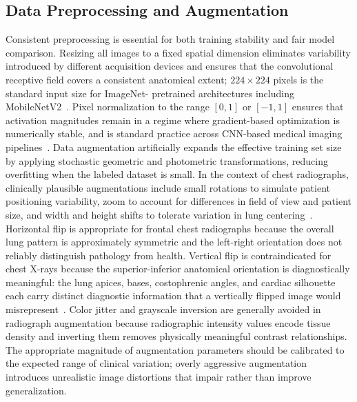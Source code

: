 \documentclass[preprint,12pt]{elsarticle}
\begin{document}
\subsection{Data Preprocessing and Augmentation}
Consistent preprocessing is essential for both training stability and
fair model comparison.
Resizing all images to a fixed spatial dimension eliminates variability
introduced by different acquisition devices and ensures that the
convolutional receptive field covers a consistent anatomical extent;
$224 \times 224$ pixels is the standard input size for ImageNet-
pretrained architectures including MobileNetV2~\cite{mobilenetv2}.
Pixel normalization to the range $[0, 1]$ or $[-1, 1]$ ensures that
activation magnitudes remain in a regime where gradient-based
optimization is numerically stable, and is standard practice across
CNN-based medical imaging pipelines~\cite{shorten2019}.
Data augmentation artificially expands the effective training set size
by applying stochastic geometric and photometric transformations,
reducing overfitting when the labeled dataset is small.
In the context of chest radiographs, clinically plausible
augmentations include small rotations to simulate patient positioning
variability, zoom to account for differences in field of view and
patient size, and width and height shifts to tolerate variation in
lung centering~\cite{shorten2019}.
Horizontal flip is appropriate for frontal chest radiographs because
the overall lung pattern is approximately symmetric and the left-right
orientation does not reliably distinguish pathology from health.
Vertical flip is contraindicated for chest X-rays because the
superior-inferior anatomical orientation is diagnostically meaningful:
the lung apices, bases, costophrenic angles, and cardiac silhouette
each carry distinct diagnostic information that a vertically flipped
image would misrepresent~\cite{chouhan2020}.
Color jitter and grayscale inversion are generally avoided in
radiograph augmentation because radiographic intensity values encode
tissue density and inverting them removes physically meaningful
contrast relationships.
The appropriate magnitude of augmentation parameters should be
calibrated to the expected range of clinical variation; overly
aggressive augmentation introduces unrealistic image distortions
that impair rather than improve generalization.

\end{document}

